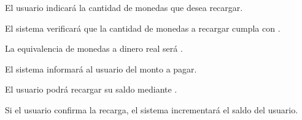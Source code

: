 \begin{RFUsuarioAutenticado}
    \begin{RFUsuarioAutenticado}
        \item El usuario indicará la cantidad de monedas que desea recargar.
        \item El sistema verificará que la cantidad de monedas a recargar cumpla con .
        \item La equivalencia de monedas a dinero real será .
        \item El sistema informará al usuario del monto a pagar.
        \item El usuario podrá recargar su saldo mediante .
        \item Si el usuario confirma la recarga, el sistema incrementará el saldo del usuario.
    \end{RFUsuarioAutenticado}

\end{RFUsuarioAutenticado}
